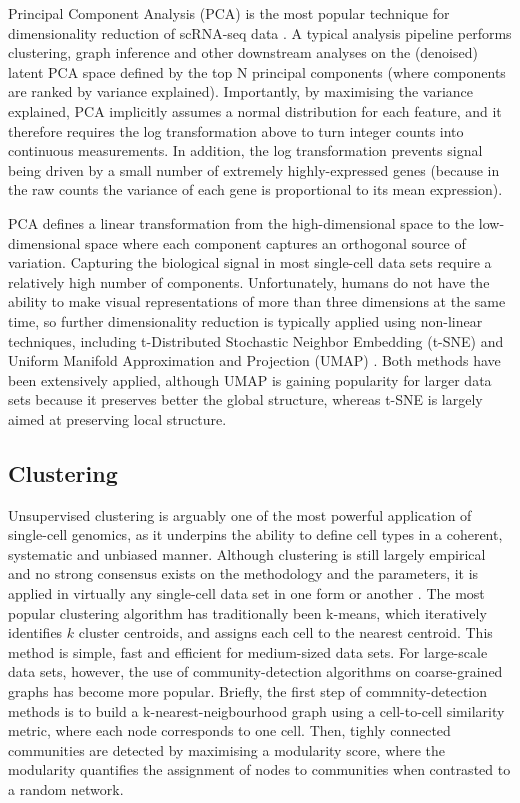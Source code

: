 Principal Component Analysis (PCA) is the most popular technique for dimensionality reduction of scRNA-seq data \cite{Luecken2019}. A typical analysis pipeline performs clustering, graph inference and other downstream analyses on the (denoised) latent PCA space defined by the top N principal components (where components are ranked by variance explained). Importantly, by maximising the variance explained, PCA implicitly assumes a normal distribution for each feature, and it therefore requires the log transformation above to turn integer counts into continuous measurements. In addition, the log transformation prevents signal being driven by a small number of extremely highly-expressed genes (because in the raw counts the variance of each gene is proportional to its mean expression). 

PCA defines a linear transformation from the high-dimensional space to the low-dimensional space where each component captures an orthogonal source of variation. Capturing the biological signal in most single-cell data sets require a relatively high number of components. Unfortunately, humans do not have the ability to make visual representations of more than three dimensions at the same time, so further dimensionality reduction is typically applied using non-linear techniques, including t-Distributed Stochastic Neighbor Embedding (t-SNE) \cite{vanDerMaaten2008} and Uniform Manifold Approximation and Projection (UMAP) \cite{McInnes2018}. Both methods have been extensively applied, although UMAP is gaining popularity for larger data sets because it preserves better the global structure, whereas t-SNE is largely aimed at preserving local structure. 

\subsection{Clustering}

Unsupervised clustering is arguably one of the most powerful application of single-cell genomics, as it underpins the ability to define cell types in a coherent, systematic and unbiased manner. Although clustering is still largely empirical and no strong consensus exists on the methodology and the parameters, it is applied in virtually any single-cell data set in one form or another \cite{Kiselev2019}. The most popular clustering algorithm has traditionally been k-means, which iteratively identifies $k$ cluster centroids, and assigns each cell to the nearest centroid. This method is simple, fast and efficient for medium-sized data sets. For large-scale data sets, however, the use of community-detection algorithms on coarse-grained graphs has become more popular. Briefly, the first step of commnity-detection methods is to build a k-nearest-neigbourhood graph using a cell-to-cell similarity metric, where each node corresponds to one cell. Then, tighly connected communities are detected by maximising a modularity score, where the modularity quantifies the assignment of nodes to communities when contrasted to a random network.

